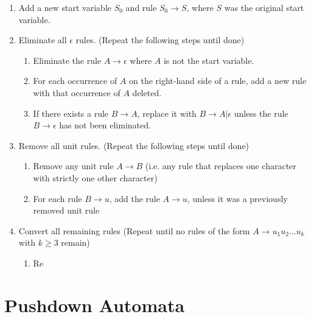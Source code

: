 \documentclass[math]{amznotes}
\begin{document}
\begin{tecbox}{}{}
    \begin{enumerate}
        \item Add a new start variable $S_0$ and rule $S_0 \to S$, where $S$ was the original start variable.
        \item Eliminate all $\epsilon$ rules. (Repeat the following steps until done)
        \begin{enumerate}
            \item Eliminate the rule $A \to \epsilon$ where $A$ is not the start variable.
            \item For each occurrence of $A$ on the right-hand side of a rule, add a new rule with that occurrence of $A$ deleted.
            \item If there exists a rule $B \to A$, replace it with $B \to A | \epsilon$ unless the rule $B \to \epsilon$ has not been eliminated.
        \end{enumerate}
        \item Remove all unit rules. (Repeat the following steps until done)
        \begin{enumerate}
            \item Remove any unit rule $A \to B$ (i.e. any rule that replaces one character with strictly one other character)
            \item For each rule $B \to u$, add the rule $A \to u$, unless it was a previously removed unit rule
        \end{enumerate}
        \item Convert all remaining rules (Repeat until no rules of the form $A \to u_1 u_2 \ldots u_k$ with $k \geq 3$ remain)
        \begin{enumerate}
            \item Re
        \end{enumerate}
    \end{enumerate}
\end{tecbox}

\chapter{Pushdown Automata}
\end{document}
